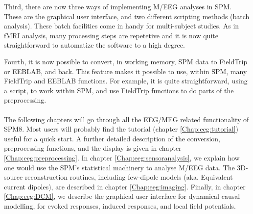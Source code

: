 Third, there are now three ways of implementing M/EEG analyses in SPM. These are the graphical user interface, and two different scripting methods (batch analysis). These batch facilities come in handy for multi-subject studies. As in fMRI analysis, many processing steps are repetetive and it is now quite straightforward to automatize the software to a high degree.

Fourth, it is now possible to convert, in working memory, SPM data to FieldTrip or EEBLAB, and back. This feature makes it possible to use, within SPM, many FieldTrip and EEBLAB functions. For example, it is quite straightforward, using a script, to work within SPM, and use FieldTrip functions to do parts of the preprocessing.
\\
\\
The following chapters will go through all the EEG/MEG related functionality of SPM8. Most users will probably find the tutorial (chapter \ref{Chap:eeg:tutorial}) useful for a quick start. A further detailed description of the conversion, preprocessing functions, and the display is given in chapter \ref{Chap:eeg:preprocessing}. In chapter \ref{Chap:eeg:sensoranalysis}, we explain how one would use the SPM's statistical machinery to analyse M/EEG data. The 3D-source reconstruction routines, including few-dipole models (aka. Equivalent current dipoles), are described in chapter \ref{Chap:eeg:imaging}. Finally, in chapter \ref{Chap:eeg:DCM}, we describe the graphical user interface for dynamical causal modelling, for evoked responses, induced responses, and local field potentials.
